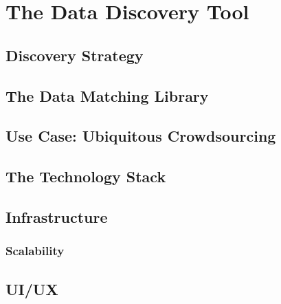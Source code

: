 \chapter{The Data Discovery Tool}\label{ch:ch2label}

\section{Discovery Strategy}


\section{The Data Matching Library}


\section{Use Case: Ubiquitous Crowdsourcing}

\section{The Technology Stack}

\section{Infrastructure}

\subsection{Scalability}

\section{UI/UX}